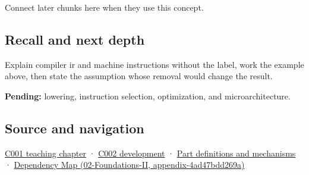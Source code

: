 Connect later chunks here when they use this concept.

\subsection{Recall and next depth}\label{recall-and-next-depth}

Explain compiler ir and machine instructions without the label, work the example above, then state the assumption whose removal would change the result.

\textbf{Pending:} lowering, instruction selection, optimization, and microarchitecture.

\subsection{Source and navigation}\label{source-and-navigation}

\href{Continuous\%20Notes/Computing\%20Foundations\%20-\%20From\%20Bits\%20to\%20C++\%20and\%20Systems\%20APIs\#From\%20a\%20signal\%20to\%20an\%20interpretation}{C001 teaching chapter} · \href{Continuous\%20Notes/Computing\%20Foundations\%20-\%20From\%20Bits\%20to\%20C++\%20and\%20Systems\%20APIs\#Arithmetic\%20becomes\%20a\%20policy}{C002 development} · \hyperref[appendix-fd090d982a15]{Part definitions and mechanisms} · \href{}{Dependency Map (02-Foundations-II, appendix-4ad47bdd269a)}
